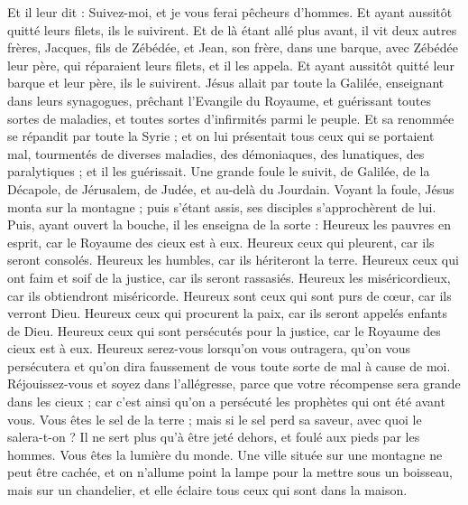 \begin{multicols}{2}
Et il leur dit : Suivez-moi, et je vous ferai pêcheurs d'hommes.
Et ayant aussitôt quitté leurs filets, ils le suivirent.
Et de là étant allé plus avant, il vit deux autres frères, Jacques, fils de Zébédée, et Jean, son frère, dans une barque, avec Zébédée leur père, qui réparaient leurs filets, et il les appela.
Et ayant aussitôt quitté leur barque et leur père, ils le suivirent.
Jésus allait par toute la Galilée, enseignant dans leurs synagogues, prêchant l'Evangile du Royaume, et guérissant toutes sortes de maladies, et toutes sortes d’infirmités parmi le peuple.
Et sa renommée se répandit par toute la Syrie ; et on lui présentait tous ceux qui se portaient mal, tourmentés de diverses maladies, des démoniaques, des lunatiques, des paralytiques ; et il les guérissait.
Une grande foule le suivit, de Galilée, de la Décapole, de Jérusalem, de Judée, et au-delà du Jourdain.
\VerseOne{}Voyant la foule, Jésus monta sur la montagne ; puis s'étant assis, ses disciples s'approchèrent de lui.
Puis, ayant ouvert la bouche, il les enseigna de la sorte :
Heureux les pauvres en esprit, car le Royaume des cieux est à eux.
Heureux ceux qui pleurent, car ils seront consolés.
Heureux les humbles, car ils hériteront la terre.
Heureux ceux qui ont faim et soif de la justice, car ils seront rassasiés.
Heureux les miséricordieux, car ils obtiendront miséricorde.
Heureux sont ceux qui sont purs de cœur, car ils verront Dieu.
Heureux ceux qui procurent la paix, car ils seront appelés enfants de Dieu.
Heureux ceux qui sont persécutés pour la justice, car le Royaume des cieux est à eux.
Heureux serez-vous lorsqu’on vous outragera, qu’on vous persécutera et qu’on dira faussement de vous toute sorte de mal à cause de moi.
Réjouissez-vous et soyez dans l’allégresse, parce que votre récompense sera grande dans les cieux ; car c’est ainsi qu’on a persécuté les prophètes qui ont été avant vous.
Vous êtes le sel de la terre ; mais si le sel perd sa saveur, avec quoi le salera-t-on ? Il ne sert plus qu’à être jeté dehors, et foulé aux pieds par les hommes.
Vous êtes la lumière du monde. Une ville située sur une montagne ne peut être cachée,
et on n'allume point la lampe pour la mettre sous un boisseau, mais sur un chandelier, et elle éclaire tous ceux qui sont dans la maison.

\end{multicols}
